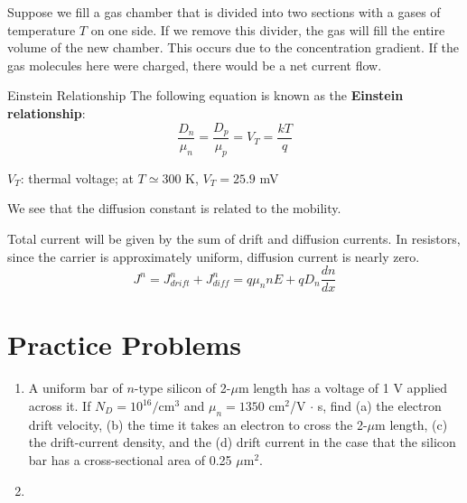 Suppose we fill a gas chamber that is divided into two sections with a gases of temperature $T$ on one side. If we remove this divider, the gas will fill the entire volume of the new chamber. This occurs due to the concentration gradient. If the gas molecules here were charged, there would be a net current flow.

\begin{Analysis}{Einstein Relationship}{}
    The following equation is known as the \textbf{Einstein relationship}:
        \[\frac{D_n}{\mu_n} = \frac{D_p}{\mu_p} = V_T = \frac{kT}{q}\]
    \begin{gline}
        \item $V_T$: thermal voltage; at $T \simeq 300$ K, $V_T = 25.9$ mV
    \end{gline}
    We see that the diffusion constant is related to the mobility.
\end{Analysis}
Total current will be given by the sum of drift and diffusion currents. In resistors, since the carrier is approximately uniform, diffusion current is nearly zero.
    \[J^n = J_{drift}^n + J_{diff}^n = q\mu_n n E + qD_n \frac{dn}{dx}\]

\section{Practice Problems}
\begin{enumerate}
    \item A uniform bar of $n$-type silicon of 2-$\mu$m length has a voltage of 1 V applied across it. If $N_D = 10^{16}/\text{cm}^3$ and $\mu_n = 1350$ cm$^2$/V $\cdot$ s, find (a) the electron drift velocity, (b) the time it takes an electron to cross the 2-$\mu$m length, (c) the drift-current density, and the (d) drift current in the case that the silicon bar has a cross-sectional area of 0.25 $\mu$m$^2$.
    \begin{Ans}
    \end{Ans}

    \item 
\end{enumerate}

